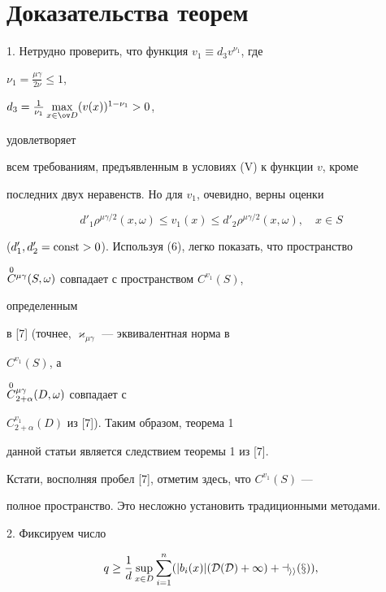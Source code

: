  


\section{Доказательства теорем} 


 


1. Нетрудно проверить, что функция $v_1\equiv d_3v^{\nu_1}$, где 


$\nu_1=\frac{\mu\gamma}{2\nu}\le1$, 


$d_3=\frac{1}{\nu_1}\max\limits_{x\in\ov D}(v(x))^{1-\nu_1}>0$, 


удовлетворяет 


всем требованиям, предъявленным в условиях (V) к функции $v$, кроме 


последних двух неравенств. Но для $v_1$, очевидно, верны оценки 


\begin{equation} 


d'_1\rho^{\mu\gamma/2}(x,\omega)\le v_1(x)\le 


d'_2\rho^{\mu\gamma/2}(x,\omega),\quad x\in S 


\end{equation} 


($d'_1,d'_2=\operatorname{const}>0$). Используя (6), легко показать, что пространство 


$\overset{0}{C}{}^{\mu\gamma}(S,\omega)$ совпадает с пространством $C^{v_1}(S)$, 


определенным 


в [7] (точнее, $\varkappa_{\mu\gamma}$ --- эквивалентная норма в 


$C^{v_1}(S)$, а 


$\overset{0}{C}{}^{\mu\gamma}_{2+\alpha}(D,\omega)$ совпадает с 


$C^{v_1}_{2+\alpha}(D)$ из [7]). Таким образом, теорема 1 


данной статьи является следствием теоремы 1 из [7]. 


 


Кстати, восполняя пробел [7], отметим здесь, что $C^{v_1}(S)$ --- 


полное пространство. Это несложно установить традиционными методами. 


\medskip 


 


2. Фиксируем число 


\begin{equation} 


q\ge\frac{1}{d}\sup_{x\in D}\sum^n_{i=1}(|b_i(x)| 


(\cal D(D)+1)+a_{ii}(x)), 


\end{equation} 



